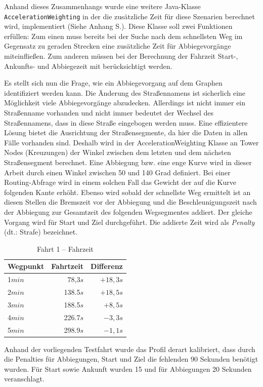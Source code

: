 Anhand dieses Zusammenhangs wurde eine weitere Java-Klasse \texttt{AccelerationWeighting} in der die zusätzliche Zeit für diese Szenarien berechnet wird, implementiert (Siehe Anhang S.\pageref{sec:source}).
Diese Klasse soll zwei Funktionen erfüllen:
Zum einen muss bereits bei der Suche nach dem schnellsten Weg im Gegensatz zu geraden Strecken eine zusätzliche Zeit für Abbiegevorgänge miteinfließen.
Zum anderen müssen bei der Berechnung der Fahrzeit Start-, Ankunfts- und Abbiegezeit mit berücksichtigt werden.

Es stellt sich nun die Frage, wie ein Abbiegevorgang auf dem Graphen identifiziert werden kann.
Die Änderung des Straßennamens ist sicherlich eine Möglichkeit viele Abbiegevorgänge abzudecken.
Allerdings ist nicht immer ein Straßenname vorhanden und nicht immer bedeutet der Wechsel des Straßennamens, dass in diese Straße eingebogen werden muss.
Eine effizientere Lösung bietet die Ausrichtung der Straßensegmente, da hier die Daten in allen Fälle vorhanden sind.
Deshalb wird in der AccelerationWeighting Klasse an Tower Nodes (Kreuzungen) der Winkel zwischen dem letzten und dem nächsten Straßensegment berechnet.
Eine Abbiegung bzw. eine enge Kurve wird in dieser Arbeit durch einen Winkel zwischen 50 und 140 Grad definiert.
Bei einer Routing-Abfrage wird in einem solchen Fall das Gewicht der auf die Kurve folgenden Kante erhöht.
Ebenso wird sobald der schnellste Weg ermittelt ist an diesen Stellen die Bremszeit vor der Abbiegung und die Beschleunigungszeit nach der Abbiegung zur Gesamtzeit des folgenden Wegsegmentes addiert.
Der gleiche Vorgang wird für Start und Ziel durchgeführt.
Die addierte Zeit wird als \textit{Penalty} (dt.: Strafe) bezeichnet.

\begin{table}[htb]
\centering
\caption{Fahrt 1 -- Fahrzeit}
\label{tab:drive11}
\begin{tabular}{|l|r|r|}
\hline
Wegpunkt & Fahrtzeit & Differenz \\ \hline 
1$min$ & 78,3$s$ & $+18,3s$ \\
2$min$ & 138.5$s$ & $+18,5s$ \\
3$min$ & 188.5$s$ & $+8,5s$ \\
4$min$ & 226.7$s$ & $-3,3s$ \\
5$min$ & 298.9$s$ & $-1,1s$ \\
\hline
\end{tabular}
\end{table}

Anhand der vorliegenden Testfahrt wurde das Profil derart kalibriert, dass durch die Penalties für Abbiegungen, Start und Ziel die fehlenden 90 Sekunden benötigt wurden.
Für Start sowie Ankunft wurden 15 und für Abbiegungen 20 Sekunden veranschlagt.

